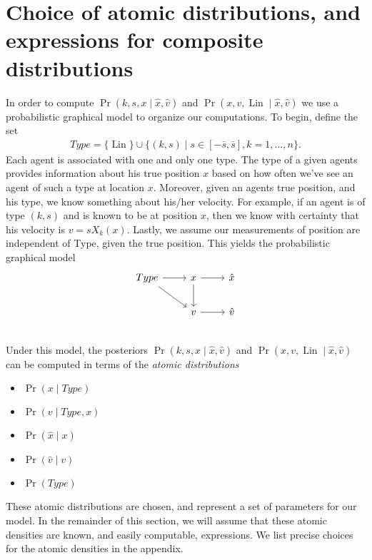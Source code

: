 \documentclass[12pt]{amsart}
\DeclareMathOperator{\Lin}{Lin}
\begin{document}
\section{Choice of atomic distributions, and expressions for composite distributions}
In order to compute $\Pr( k,s,x \mid \hat{x}, \hat{v} )$ and $\Pr( x, v, \Lin \mid \hat{x}, \hat{v} )$ we use a probabilistic graphical model to organize our computations.
To begin, define the set
\begin{align*}
	Type = \{ \Lin \} \cup \{ (k,s) \mid s \in [-\bar{s}, \bar{s}] , k = 1,\dots,n\}.
\end{align*}
Each agent is associated with one and only one type.
The type of a given agents provides information about his true position $x$ based on how often we've see an agent of such a type at location $x$.
Moreover, given an agents true position, and his type, we know something about his/her velocity.
For example, if an agent is of type $(k,s)$ and is known to be at position $x$, then we know with certainty that his velocity is $v = sX_k(x)$.
Lastly, we assume our measurements of position are independent of Type, given the true position.
This yields the probabilistic graphical model
\begin{equation}
\begin{tikzcd}
	Type \arrow[r] \arrow[rd] & x \arrow[d] \arrow[r] & \hat{x} \\
	 & v \ar[r] & \hat{v} \\
\end{tikzcd}
\label{eq:pgm}
\end{equation}
Under this model, the posteriors $\Pr( k,s,x \mid \hat{x}, \hat{v} )$ and $\Pr( x, v, \Lin \mid \hat{x}, \hat{v} )$ can be computed in terms of the \emph{atomic distributions}
\begin{itemize}
	\item $\Pr( x \mid Type )$
	\item $\Pr( v \mid Type, x)$
	\item $\Pr( \hat{x} \mid x)$
	\item $\Pr( \hat{v} \mid v)$
	\item $\Pr(Type)$
\end{itemize}
These atomic distributions are chosen, and represent a set of parameters for our model.
In the remainder of this section, we will assume that these atomic densities are known, and easily computable, expressions.
We list precise choices for the atomic densities in the appendix.
\end{document}
